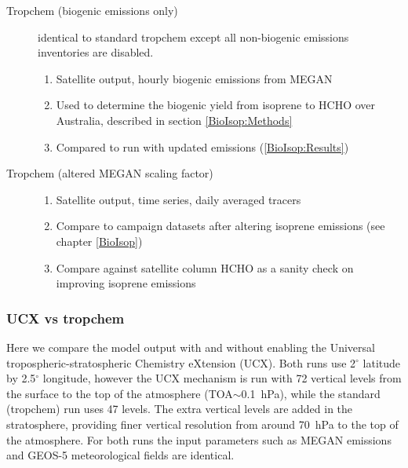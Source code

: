 \begin{description}
        \item [Tropchem (biogenic emissions only)]%
          identical to standard tropchem except all non-biogenic emissions inventories are disabled.
        \begin{enumerate}
          \item Satellite output, hourly biogenic emissions from MEGAN
          \item Used to determine the biogenic yield from isoprene to HCHO over Australia, described in section \ref{BioIsop:Methods}
          \item Compared to run with updated emissions (\ref{BioIsop:Results})
        \end{enumerate}
        
        \item [Tropchem (altered MEGAN scaling factor)]
        \begin{enumerate}
          \item Satellite output, time series, daily averaged tracers
          \item Compare to campaign datasets after altering isoprene emissions (see chapter \ref{BioIsop})
          \item Compare against satellite column HCHO as a sanity check on improving isoprene emissions
        \end{enumerate}
        
      \end{description}
    
    
    
    
    \subsubsection{UCX vs tropchem}
      \label{Model:GC:simulation:comparison}
      
      Here we compare the model output with and without enabling the Universal tropospheric-stratospheric Chemistry eXtension (UCX).
      Both runs use 2$^{\circ}$ latitude by 2.5$^{\circ}$ longitude, however the UCX mechanism is run with 72 vertical levels from the surface to the top of the atmosphere (TOA$\sim$0.1~hPa), while the standard (tropchem) run uses 47 levels.
      The extra vertical levels are added in the stratosphere, providing finer vertical resolution from around 70~hPa to the top of the atmosphere.
      For both runs the input parameters such as MEGAN emissions and GEOS-5 meteorological fields are identical.
      
